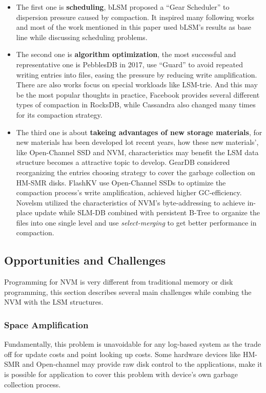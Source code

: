 \begin{itemize}
	\item The first one is \textbf{scheduling},  bLSM\cite{sears2012blsm} proposed a ``Gear Scheduler'' to dispersion pressure caused by compaction. It inspired many following works and most of the work mentioned in this paper used bLSM's results as base line while discussing scheduling problems. 
	\item 	The second one is \textbf{algorithm optimization}, the most successful and representative one is PebblesDB in 2017\cite{raju2017pebblesdb}, use ``Guard'' to avoid repeated writing entries into files, easing the pressure by reducing write amplification. There are also works focus on special workloads like LSM-trie\cite{wu2015lsm}. And this may be the most popular thoughts in practice, Facebook provides several different types of compaction in RocksDB\cite{Compacti60:online},\cite{dong2017optimizing} while Cassandra also changed many times for its compaction strategy\cite{Document20:online}.  
	\item The third one is about \textbf{takeing advantages of new storage materials}, for new materials has been developed lot recent years, how these new materials', like Open-Channel SSD\cite{bjorling2017lightnvm} and NVM, characteristics may benefit the LSM data structure becomes a attractive topic to develop. GearDB\cite{yao2019geardb} considered reorganizing the entries choosing strategy to cover the garbage collection on HM-SMR disks. FlashKV\cite{zhang2017flashkv} use Open-Channel SSDs to optimize the compaction process's write amplification, achieved higher GC-efficiency. Novelsm\cite{kannan2018redesigning} utilized the characteristics of NVM's byte-addressing to achieve in-place update while SLM-DB\cite{kaiyrakhmet2019slm} combined with persistent B-Tree to organize the files into one single level and use \textit{select-merging} to get better performance in compaction.
\end{itemize}

\subsection{Opportunities and Challenges}
Programming for NVM is very different from traditional memory or disk programming, this section describes several main challenges while combing the NVM with the LSM structures.
\subsubsection{Space Amplification}
Fundamentally, this problem is unavoidable for any log-based system as the trade off for update costs and point looking up costs. Some hardware devices like HM-SMR and Open-channel may provide raw disk control to the applications, make it is possible for application to cover this problem with device's own garbage collection process\cite{zhang2017flashkv}.

